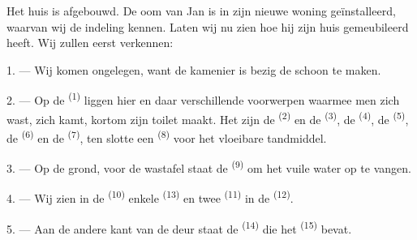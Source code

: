 %
%

\VUsaut{6.0mm}
\VUsaut{1.4mm}
\VUsaut{0.4mm}
\VUsaut{2.2mm}

Het huis is afgebouwd. De oom van Jan is in zijn nieuwe woning geïnstalleerd, waarvan wij de
indeling kennen. Laten wij nu zien hoe hij zijn huis gemeubileerd heeft. Wij zullen eerst
verkennen:

\VUsaut{3.0mm}

1. --- Wij komen ongelegen, want de kamenier is bezig de  schoon te maken.

2. --- Op de  \textsuperscript{(1)} liggen hier en daar verschillende
voorwerpen waarmee men zich wast, zich kamt, kortom zijn toilet maakt. Het zijn de
 \textsuperscript{(2)} en de
 \textsuperscript{(3)}, de 
\textsuperscript{(4)}, de  \textsuperscript{(5)}, de 
\textsuperscript{(6)} en de  \textsuperscript{(7)}, ten slotte een
 \textsuperscript{(8)} voor het vloeibare tandmiddel.

3. --- Op de grond, voor de wastafel staat de  \textsuperscript{(9)} om het
vuile water op te vangen.

4. --- Wij zien in de  \textsuperscript{(10)} enkele
 \textsuperscript{(13)} en twee 
\textsuperscript{(11)} in de  \textsuperscript{(12)}.

5. --- Aan de andere kant van de deur staat de  \textsuperscript{(14)} die
het  \textsuperscript{(15)} bevat.

